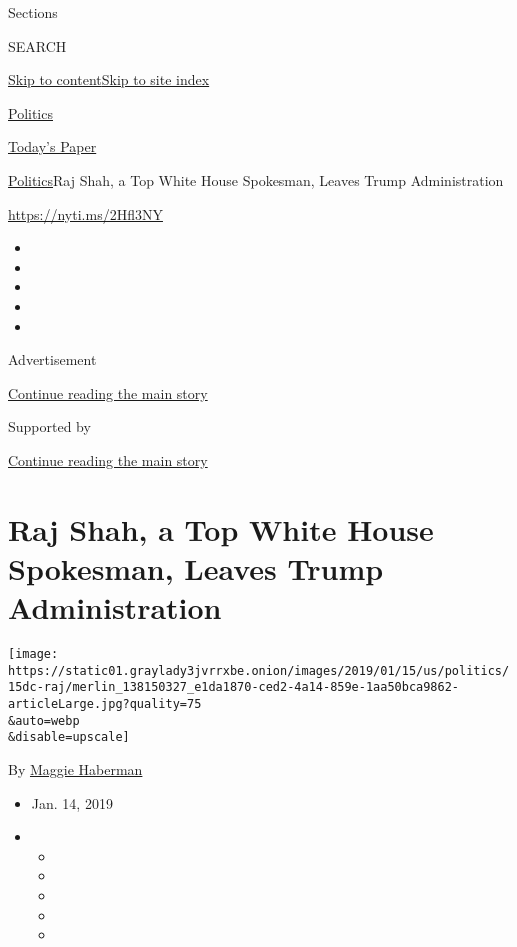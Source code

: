 Sections

SEARCH

\protect\hyperlink{site-content}{Skip to
content}\protect\hyperlink{site-index}{Skip to site index}

\href{https://www.nytimes3xbfgragh.onion/section/politics}{Politics}

\href{https://myaccount.nytimes3xbfgragh.onion/auth/login?response_type=cookie\&client_id=vi}{}

\href{https://www.nytimes3xbfgragh.onion/section/todayspaper}{Today's
Paper}

\href{/section/politics}{Politics}\textbar{}Raj Shah, a Top White House
Spokesman, Leaves Trump Administration

\url{https://nyti.ms/2Hfl3NY}

\begin{itemize}
\item
\item
\item
\item
\item
\end{itemize}

Advertisement

\protect\hyperlink{after-top}{Continue reading the main story}

Supported by

\protect\hyperlink{after-sponsor}{Continue reading the main story}

\hypertarget{raj-shah-a-top-white-house-spokesman-leaves-trump-administration}{%
\section{Raj Shah, a Top White House Spokesman, Leaves Trump
Administration}\label{raj-shah-a-top-white-house-spokesman-leaves-trump-administration}}

\texttt{[image: https://static01.graylady3jvrrxbe.onion/images/2019/01/15/us/politics/15dc-raj/merlin\_138150327\_e1da1870-ced2-4a14-859e-1aa50bca9862-articleLarge.jpg?quality=75\\\&auto=webp\\\&disable=upscale]}

By \href{https://www.nytimes3xbfgragh.onion/by/maggie-haberman}{Maggie
Haberman}

\begin{itemize}
\item
  Jan. 14, 2019
\item
  \begin{itemize}
  \item
  \item
  \item
  \item
  \item
  \end{itemize}
\end{itemize}


